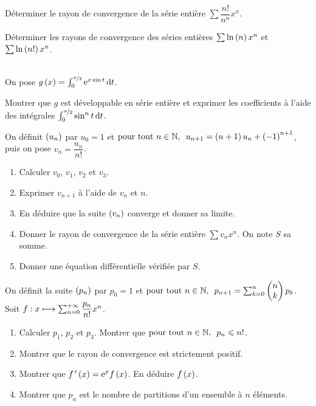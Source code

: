 \begin{exo}
Déterminer le rayon de convergence de la série entière \(\sum\dfrac{n!}{n^n}x^n\).
\end{exo}

\begin{exo}
Déterminer les rayons de convergence des séries entières \(\sum\ln\left(n\right)x^n\) et \(\sum\ln\left(n!\right)x^n\).
\end{exo}

\begin{exo}~\\
On pose \(g\paren{x}=\int_0^{\nicefrac{\pi}{2}}\e{x\sin t}\odif{t}\).

Montrer que \(g\) est développable en série entière et exprimer les coefficients à l'aide des intégrales \(\int_0^{\nicefrac{\pi}{2}}\sin^nt\odif{t}\).
\end{exo}

\begin{exo}
On définit \(\left(u_n\right)\) par \(u_0=1\) et \(\quantifs{\tpt n\in\N}u_{n+1}=\paren{n+1}u_n+\paren{-1}^{n+1}\), puis on pose \(v_n=\dfrac{u_n}{n!}\).

\begin{enumerate}
    \item Calculer \(v_0\), \(v_1\), \(v_2\) et \(v_3\). \\
    \item Exprimer \(v_{n+1}\) à l'aide de \(v_n\) et \(n\). \\
    \item En déduire que la suite \(\left(v_n\right)\) converge et donner sa limite. \\
    \item Donner le rayon de convergence de la série entière \(\sum v_nx^n\). On note \(S\) sa somme. \\
    \item Donner une équation différentielle vérifiée par \(S\).
\end{enumerate}
\end{exo}

\begin{exo}
On définit la suite \(\left(p_n\right)\) par \(p_0=1\) et \(\quantifs{\tpt n\in\N}p_{n+1}=\sum_{k=0}^n\binom{k}{n}p_k\). Soit \(f:x\longmapsto\sum_{n=0}^{+\infty}\dfrac{p_n}{n!}x^n\).

\begin{enumerate}
    \item Calculer \(p_1\), \(p_2\) et \(p_3\). Montrer que \(\quantifs{\tpt n\in\N}p_n\leq n!\). \\
    \item Montrer que le rayon de convergence est strictement positif. \\
    \item Montrer que \(f^{\,\prime}\left(x\right)=\mathrm{e}^{x}f\left(x\right)\). En déduire \(f\left(x\right)\). \\
    \item Montrer que \(p_n\) est le nombre de partitions d'un ensemble à \(n\) éléments.
\end{enumerate}
\end{exo}

